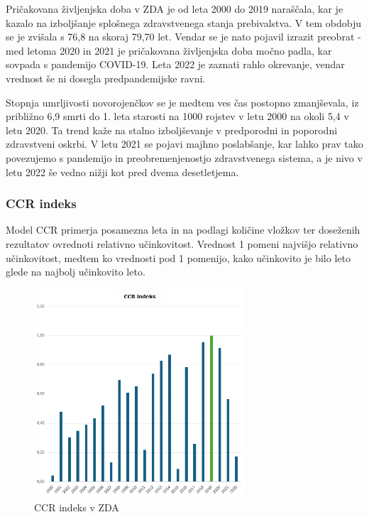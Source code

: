 \documentclass[12pt,a4paper]{article}
\theoremstyle{definition}
\begin{document}
Pričakovana življenjska doba v ZDA je od leta 2000 do 2019 naraščala, 
kar je kazalo na izboljšanje splošnega zdravstvenega stanja prebivalstva. 
V tem obdobju se je zvišala s 76,8 na skoraj 79,70 let. 
Vendar se je nato pojavil izrazit preobrat - med letoma 2020 in 2021 je pričakovana življenjska doba močno padla, 
kar sovpada s pandemijo COVID-19. Leta 2022 je zaznati rahlo okrevanje, vendar vrednost še ni dosegla predpandemijske ravni.

Stopnja umrljivosti novorojenčkov se je medtem ves čas postopno zmanjševala, iz približno 6,9 smrti do 1. leta starosti na 
1000 rojstev v letu 2000 na okoli 5,4 v letu 2020. 
Ta trend kaže na stalno izboljševanje v predporodni in poporodni zdravstveni oskrbi. 
V letu 2021 se pojavi majhno poslabšanje, 
kar lahko prav tako povezujemo s pandemijo in preobremenjenostjo zdravstvenega sistema, 
a je nivo v letu 2022 še vedno nižji kot pred dvema desetletjema.

\subsubsection{CCR indeks}
Model CCR primerja posamezna leta in na podlagi količine vložkov ter doseženih rezultatov ovrednoti relativno učinkovitost. 
Vrednost 1 pomeni najvišjo relativno učinkovitost, medtem ko vrednosti pod 1 pomenijo, 
kako učinkovito je bilo leto glede na najbolj učinkovito leto.

\begin{figure}[H]
    \centering
    \includegraphics[width=0.7\textwidth]{ccr_zda.png}
    \caption{CCR indeks v ZDA}
    \label{fig:ccr_zda}
\end{figure}
\end{document}
